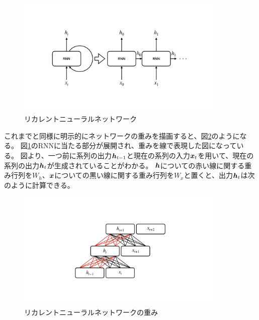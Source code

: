 \begin{figure}[h]
 \centering
 \includegraphics[trim = 0 200 0 200, width=0.9\textwidth, clip]{Figure/2DeepLearning/7RecurrentNeuralNetwork.png}
 \caption{リカレントニューラルネットワーク}
 \label{7RecurrentNeuralNetwork}
\end{figure}

これまでと同様に明示的にネットワークの重みを描画すると、図\ref{8RNNWeight}のようになる。
図\ref{7RecurrentNeuralNetwork}のRNNに当たる部分が展開され、重みを線で表現した図になっている。
図より、一つ前に系列の出力${\mbox{\boldmath{$h$}}}_{t-1}$と現在の系列の入力${\mbox{\boldmath{$x$}}}_t$を用いて、現在の系列の出力${\mbox{\boldmath{$h$}}}_t$が生成されていることがわかる。
${\mbox{\boldmath{$h$}}}$についての赤い線に関する重み行列を$W_h$、${\mbox{\boldmath{$x$}}}$についての黒い線に関する重み行列を$W_x$と置くと、出力${\mbox{\boldmath{$h$}}}_t$は次のように計算できる。

\begin{figure}[h]
 \centering
 \includegraphics[trim = 0 200 0 200, width=0.9\textwidth, clip]{Figure/2DeepLearning/8RNNWeight.png}
 \caption{リカレントニューラルネットワークの重み}
 \label{8RNNWeight}
\end{figure}

